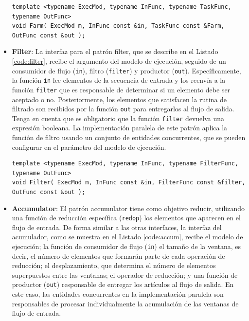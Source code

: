 \begin{itemize}
    \vspace{0.35cm}
    \begin{lstlisting}[frame=single,label={code:Farm},caption={Interfaz Farm.}]
template <typename ExecMod, typename InFunc, typename TaskFunc, typename OutFunc>
void Farm( ExecMod m, InFunc const &in, TaskFunc const &Farm, OutFunc const &out );
\end{lstlisting}
\vspace{0.35cm}
    
    \item \textbf{Filter}: La interfaz para el patrón filter, que se describe en el Listado \ref{code:filter}, recibe el argumento del modelo de ejecución, seguido de un consumidor de flujo (\texttt{in}), filtro (\texttt{filter}) y productor (\texttt{out}). Específicamente, la función \texttt{in} lee elementos de la secuencia de entrada y los reenvía a la función \texttt{filter} que es responsable de determinar si un elemento debe ser aceptado o no. Posteriormente, los elementos que satisfacen la rutina de filtrado son recibidos por la función \texttt{out} para entregarlos al flujo de salida. Tenga en cuenta que es obligatorio que la función \texttt{filter} devuelva una expresión booleana. La implementación paralela de este patrón aplica la función de filtro usando un conjunto de entidades concurrentes, que se pueden configurar en el parámetro del modelo de ejecución.
    
    \vspace{0.35cm}
    \begin{lstlisting}[frame=single,label={code:filter},caption={Interfaz Filter.}]
template <typename ExecMod, typename InFunc, typename FilterFunc, typename OutFunc>
void Filter( ExecMod m, InFunc const &in, FilterFunc const &filter, OutFunc const &out );
\end{lstlisting}
\vspace{0.35cm}
    
    \item \textbf{Accumulator}: El patrón accumulator tiene como objetivo reducir, utilizando una función de reducción específica (\texttt{redop}) los elementos que aparecen en el flujo de entrada. De forma similar a las otras interfaces, la interfaz del acumulador, como se muestra en el Listado \ref{code:accum}, recibe el modelo de ejecución; la función de consumidor de flujo (\texttt{in}) el tamaño de la ventana, es decir, el número de elementos que formarán parte de cada operación de reducción; el desplazamiento, que determina el número de elementos superpuestos entre las ventanas; el operador de reducción; y una función de productor (\texttt{out}) responsable de entregar los artículos al flujo de salida. En este caso, las entidades concurrentes en la implementación paralela son responsables de procesar individualmente la acumulación de las ventanas de flujo de entrada.
    

\end{itemize}
